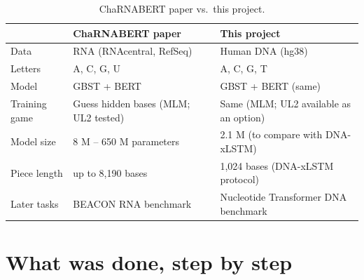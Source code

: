 \documentclass[11pt,a4paper]{article}
\begin{document}
\begin{table}[h]
\centering
\caption{ChaRNABERT paper vs.\ this project.}
\small
\begin{tabularx}{0.9\linewidth}{lLL}
\toprule
 & ChaRNABERT paper & This project \\
\midrule
Data & RNA (RNAcentral, RefSeq) & Human DNA (hg38) \\
Letters & A, C, G, U & A, C, G, T \\
Model & GBST + BERT & GBST + BERT (same) \\
Training game & Guess hidden bases (MLM; UL2 tested) & Same (MLM; UL2 available as an option) \\
Model size & 8 M -- 650 M parameters & 2.1 M (to compare with DNA-xLSTM) \\
Piece length & up to 8,190 bases & 1,024 bases (DNA-xLSTM protocol) \\
Later tasks & BEACON RNA benchmark & Nucleotide Transformer DNA benchmark \\
\bottomrule
\end{tabularx}
\end{table}

\section{What was done, step by step}
\end{document}
